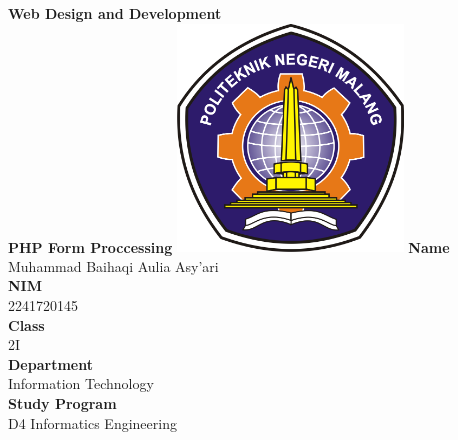 \documentclass[12pt,titlepage]{article}
\newcommand{\vSubject}{Web Design and Development}
\newcommand{\vSubtitle}{PHP Form Proccessing}
\newcommand{\vName}{Muhammad Baihaqi Aulia Asy'ari}
\newcommand{\vNIM}{2241720145}
\newcommand{\vClass}{2I}
\newcommand{\vDepartment}{Information Technology}
\newcommand{\vStudyProgram}{D4 Informatics Engineering}
\begin{document}
\begin{titlepage}
    \centering
    \vfill
    {\bfseries\LARGE
        \vSubject\\
        \vskip0.25cm
        \vSubtitle
    }
    \vfill
    \includegraphics[width=6cm]{images/polinema-logo.png}
    \vfill
    {
        \textbf{Name}\\
        \vName\\
        \vskip0.5cm
        \textbf{NIM}\\
        \vNIM\\
        \vskip0.5cm
        \textbf{Class}\\
        \vClass\\
        \vskip0.5cm
        \textbf{Department}\\
        \vDepartment\\
        \vskip0.5cm
        \textbf{Study Program}\\
        \vStudyProgram
    }
\end{titlepage}

\newpage
\end{document}

